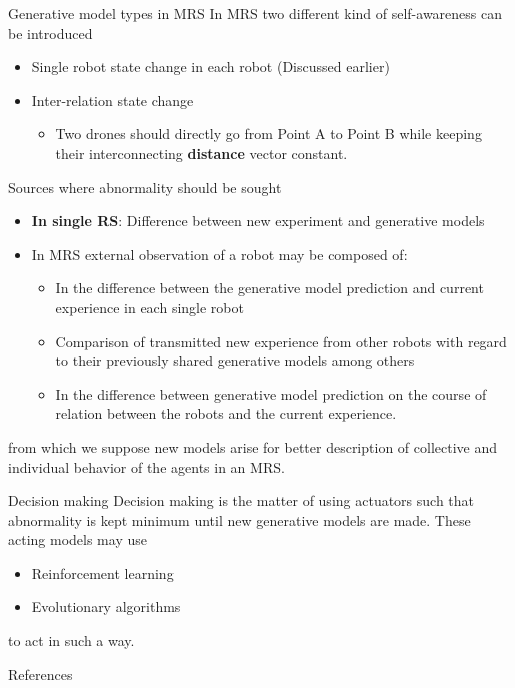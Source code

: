 \documentclass[unknownkeysallowed]{beamer}
\begin{document}
	\begin{frame}{Generative model types in MRS}
		In MRS two different kind of self-awareness can be introduced
		\begin{itemize}
			\item Single robot state change in each robot (Discussed earlier)
			\item Inter-relation state change
				\begin{itemize}
					\item Two drones should directly go from Point A to Point B while keeping their interconnecting \textbf{distance} vector constant.
				\end{itemize}
		\end{itemize}
	\end{frame}

	\begin{frame}{Sources where abnormality should be sought}
		\begin{itemize}
			\item \textbf{In single RS}: Difference between new experiment and generative models
			\item In MRS external observation of a robot may be composed of:
				\begin{itemize}
					\item In the difference between the generative model prediction and current experience in each single robot
					\item Comparison of transmitted new experience from other robots with regard to their previously shared generative models among others
					\item In the difference between generative model prediction on the course of relation between the robots and the current experience. 
				\end{itemize}
		\end{itemize}
		from which we suppose new models arise for better description of collective and individual behavior of the agents in an MRS. 
	\end{frame}

	\begin{frame}{Decision making}
		Decision making is the matter of using actuators such that abnormality is kept minimum until new generative models are made.
		These acting models may use
		\begin{itemize}
			\item Reinforcement learning
			\item Evolutionary algorithms
		\end{itemize} 
		to act in such a way.
	\end{frame}

	\begin{frame}[allowframebreaks]{References}
		\printbibliography
	\end{frame}
\end{document}
